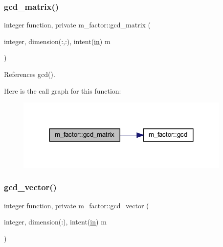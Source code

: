 \subsubsection{\texorpdfstring{gcd\+\_\+matrix()}{gcd\_matrix()}}
{\footnotesize\ttfamily integer function, private m\+\_\+factor\+::gcd\+\_\+matrix (\begin{DoxyParamCaption}\item[{integer, dimension(\+:,\+:), intent(\hyperlink{M__journal_83_8txt_afce72651d1eed785a2132bee863b2f38}{in})}]{m }\end{DoxyParamCaption})\hspace{0.3cm}{\ttfamily [private]}}



References gcd().

Here is the call graph for this function\+:
\nopagebreak
\begin{figure}[H]
\begin{center}
\leavevmode
\includegraphics[width=300pt]{namespacem__factor_a6edfef428cb51a2cbe97cfb0ad25da8b_cgraph}
\end{center}
\end{figure}
\mbox{\label{namespacem__factor_a60713d4c44895b4c18d4d6d9449ceaf7}} 
\subsubsection{\texorpdfstring{gcd\+\_\+vector()}{gcd\_vector()}}
{\footnotesize\ttfamily integer function, private m\+\_\+factor\+::gcd\+\_\+vector (\begin{DoxyParamCaption}\item[{integer, dimension(\+:), intent(\hyperlink{M__journal_83_8txt_afce72651d1eed785a2132bee863b2f38}{in})}]{m }\end{DoxyParamCaption})\hspace{0.3cm}{\ttfamily [private]}}



